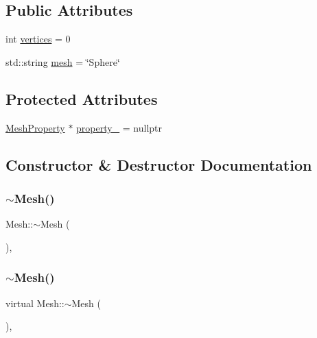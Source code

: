\subsection*{Public Attributes}
\begin{DoxyCompactItemize}
\item 
int \mbox{\hyperlink{class_mesh_a922390e7245b484961cf4f6e9e37c9dd}{vertices}} = 0
\item 
std\+::string \mbox{\hyperlink{class_mesh_a5878a5aeed5faa444201d58f57ef394a}{mesh}} = \char`\"{}Sphere\char`\"{}
\end{DoxyCompactItemize}
\subsection*{Protected Attributes}
\begin{DoxyCompactItemize}
\item 
\mbox{\hyperlink{class_mesh_property}{Mesh\+Property}} $\ast$ \mbox{\hyperlink{class_mesh_a25f284c2edef151fecad1ee4fb9aefd4}{property\+\_\+}} = nullptr
\end{DoxyCompactItemize}


\subsection{Constructor \& Destructor Documentation}
\mbox{\label{class_mesh_a5efe4da1a4c0971cfb037bd70304c303}} 
\subsubsection{\texorpdfstring{$\sim$Mesh()}{~Mesh()}\hspace{0.1cm}{\footnotesize\ttfamily [1/10]}}
{\footnotesize\ttfamily Mesh\+::$\sim$\+Mesh (\begin{DoxyParamCaption}{ }\end{DoxyParamCaption})\hspace{0.3cm}{\ttfamily [inline]}, {\ttfamily [virtual]}}

\mbox{\label{class_mesh_ad6a041191ed55c693254e945ce2869ff}} 
\subsubsection{\texorpdfstring{$\sim$Mesh()}{~Mesh()}\hspace{0.1cm}{\footnotesize\ttfamily [2/10]}}
{\footnotesize\ttfamily virtual Mesh\+::$\sim$\+Mesh (\begin{DoxyParamCaption}{ }\end{DoxyParamCaption})\hspace{0.3cm}{\ttfamily [inline]}, {\ttfamily [virtual]}}

